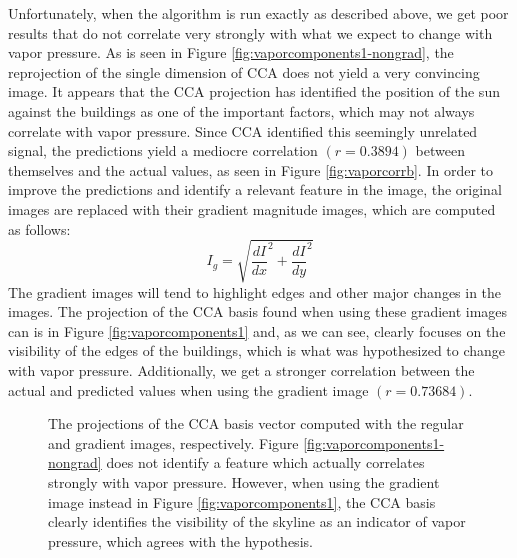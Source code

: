 Unfortunately, when the algorithm is run exactly as described above, we get poor results that do not correlate very strongly with what we expect to change with vapor pressure. As is seen in Figure \ref{fig:vaporcomponents1-nongrad}, the reprojection of the single dimension of CCA does not yield a very convincing image. It appears that the CCA projection has identified the position of the sun against the buildings as one of the important factors, which may not always correlate with vapor pressure. Since CCA identified this seemingly unrelated signal, the predictions yield a mediocre correlation $(r=0.3894)$ between themselves and the actual values, as seen in Figure \ref{fig:vaporcorrb}. In order to improve the predictions and identify a relevant feature in the image, the original images are replaced with their gradient magnitude images, which are computed as follows:
\begin{equation}\label{eq:grad}I_g=\sqrt{\frac{dI}{dx}^2 + \frac{dI}{dy}^2}\end{equation}
The gradient images will tend to highlight edges and other major changes in the images. The projection of the CCA basis found when using these gradient images can is in Figure \ref{fig:vaporcomponents1} and, as we can see, clearly focuses on the visibility of the edges of the buildings, which is what was hypothesized to change with vapor pressure. Additionally, we get a stronger correlation between the actual and predicted values when using the gradient image $(r=0.73684)$.
\begin{figure}
	\centering
	\caption[The projections of the CCA basis vector computed with the regular and gradient images]{The projections of the CCA basis vector computed with the regular and gradient images, respectively. Figure \ref{fig:vaporcomponents1-nongrad} does not identify a feature which actually correlates strongly with vapor pressure. However, when using the gradient image instead in Figure \ref{fig:vaporcomponents1}, the CCA basis clearly identifies the visibility of the skyline as an indicator of vapor pressure, which agrees with the hypothesis.}
	\label{fig:vaporcomponents}
\end{figure}
